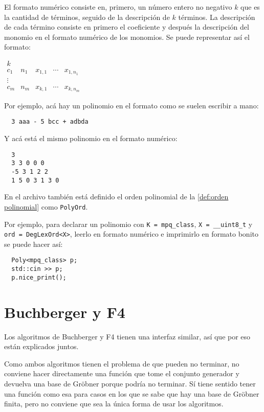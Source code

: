 \documentclass[12pt]{report}
\theoremstyle{customstyle}
\theoremstyle{factstyle}
\begin{document}
El formato numérico consiste en, primero, un número entero no negativo $k$ que es la cantidad de términos, seguido de la descripción de $k$ términos. La descripción de cada término consiste en primero el coeficiente y después la descripción del monomio en el formato numérico de los monomios. Se puede representar así el formato:

$\begin{array}{llllll}
  k &&&& \\
  c_1 & n_1 & x_{1, 1} & ⋯ & x_{1, n_1} \\
  ⋮ &&&& \\
  c_m & n_m & x_{k, 1} & ⋯ & x_{k, n_m}
\end{array}$

Por ejemplo, acá hay un polinomio en el formato como se suelen escribir a mano:

\begin{lstlisting}
  3 aaa - 5 bcc + adbda
\end{lstlisting}

\noindent Y acá está el mismo polinomio en el formato numérico:

\begin{lstlisting}
  3
  3 3 0 0 0
  -5 3 1 2 2
  1 5 0 3 1 3 0
\end{lstlisting}

En el archivo  también está definido el orden polinomial de la \cref{def:orden polinomial} como \texttt{PolyOrd}.

Por ejemplo, para declarar un polinomio con \texttt{K = mpq\_class}, \texttt{X = \_\_uint8\_t} y \texttt{ord = DegLexOrd<X>}, leerlo en formato numérico e imprimirlo en formato bonito se puede hacer así:

\begin{verbatim}
  Poly<mpq_class> p;
  std::cin >> p;
  p.nice_print();
\end{verbatim}

\section{Buchberger y F4}

Los algoritmos de Buchberger y F4 tienen una interfaz similar, así que por eso están explicados juntos.

Como ambos algoritmos tienen el problema de que pueden no terminar, no conviene hacer directamente una función que tome el conjunto generador y devuelva una base de Gröbner porque podría no terminar. Sí tiene sentido tener una función como esa para casos en los que se sabe que hay una base de Gröbner finita, pero no conviene que sea la única forma de usar los algoritmos.
\end{document}
